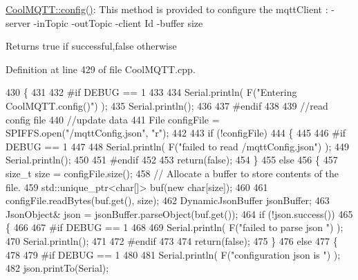 \hyperlink{class_cool_m_q_t_t_a6571671781a505feca9a8a56e256c6bc}{Cool\+M\+Q\+T\+T\+::config()}\+: This method is provided to configure the mqtt\+Client \+: -\/server -\/in\+Topic -\/out\+Topic -\/client Id -\/buffer size

\begin{DoxyReturn}{Returns}
true if successful,false otherwise 
\end{DoxyReturn}


Definition at line 429 of file Cool\+M\+Q\+T\+T.\+cpp.


\begin{DoxyCode}
430 \{
431 
432 \textcolor{preprocessor}{#if DEBUG == 1 }
433 
434     Serial.println( F(\textcolor{stringliteral}{"Entering CoolMQTT.config()"}) );
435     Serial.println();
436 
437 \textcolor{preprocessor}{#endif}
438 
439     \textcolor{comment}{//read config file}
440     \textcolor{comment}{//update data}
441     File configFile = SPIFFS.open(\textcolor{stringliteral}{"/mqttConfig.json"}, \textcolor{stringliteral}{"r"});
442 
443     \textcolor{keywordflow}{if} (!configFile) 
444     \{
445     
446 \textcolor{preprocessor}{    #if DEBUG == 1 }
447 
448         Serial.println( F(\textcolor{stringliteral}{"failed to read /mqttConfig.json"}) );
449         Serial.println();
450 
451 \textcolor{preprocessor}{    #endif}
452 
453         \textcolor{keywordflow}{return}(\textcolor{keyword}{false});
454     \}
455     \textcolor{keywordflow}{else}
456     \{
457         \textcolor{keywordtype}{size\_t} size = configFile.size();
458         \textcolor{comment}{// Allocate a buffer to store contents of the file.}
459         std::unique\_ptr<char[]> buf(\textcolor{keyword}{new} \textcolor{keywordtype}{char}[size]);
460 
461         configFile.readBytes(buf.get(), size);
462         DynamicJsonBuffer jsonBuffer;
463         JsonObject& json = jsonBuffer.parseObject(buf.get());
464         \textcolor{keywordflow}{if} (!json.success()) 
465         \{
466         
467 \textcolor{preprocessor}{        #if DEBUG == 1 }
468 
469             Serial.println( F(\textcolor{stringliteral}{"failed to parse json "}) );
470             Serial.println();
471         
472 \textcolor{preprocessor}{        #endif}
473             
474             \textcolor{keywordflow}{return}(\textcolor{keyword}{false});
475         \} 
476         \textcolor{keywordflow}{else}
477         \{
478         
479 \textcolor{preprocessor}{        #if DEBUG == 1 }
480         
481             Serial.println( F(\textcolor{stringliteral}{"configuration json is "}) );
482             json.printTo(Serial);

\end{DoxyCode}
